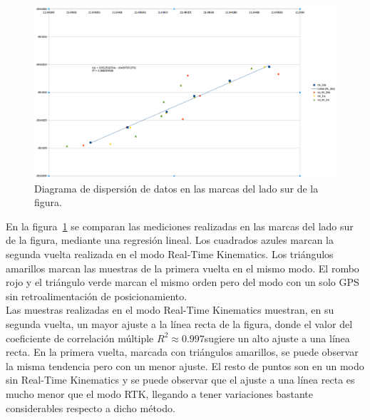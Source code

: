 \begin{figure}[H]
\centering
\includegraphics[scale=0.3]{Figures/Dispers}
\caption[Diagrama de dispersión de datos en las marcas del lado sur de la figura.]{Diagrama de dispersión de datos en las marcas del lado sur de la figura.}
\label{fig:Disp}
\end{figure}

En la figura~\ref{fig:Disp} se comparan las mediciones realizadas en las marcas del lado sur de la figura, mediante una regresión lineal. Los cuadrados azules marcan la segunda vuelta realizada en el modo Real-Time Kinematics. Los triángulos amarillos marcan las muestras de la primera vuelta en el mismo modo. El rombo rojo y el triángulo verde marcan el mismo orden pero del modo con un solo GPS sin retroalimentación de posicionamiento.\\

Las muestras realizadas en el modo Real-Time Kinematics muestran, en su segunda vuelta, un mayor ajuste a la línea recta de la figura, donde el valor del coeficiente de correlación múltiple $R^{2} \approx 0.997$\footnotemark sugiere un alto ajuste a una línea recta. En la primera vuelta, marcada con triángulos amarillos, se puede observar la misma tendencia pero con un menor ajuste. El resto de puntos son en un modo sin Real-Time Kinematics y se puede observar que el ajuste a una línea recta es mucho menor que el modo RTK, llegando a tener variaciones bastante considerables respecto a dicho método.\\


